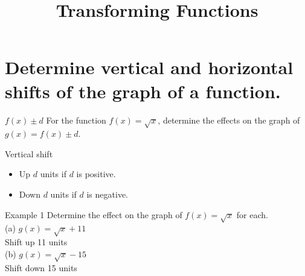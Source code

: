 \documentclass[t,usenames,dvipsnames]{beamer}
\title{Transforming Functions}
\author{}
\date{}
\begin{document}
\begin{frame}
    \titlepage
\end{frame}

\section{Determine vertical and horizontal shifts of the graph of a function.}

\begin{frame}{$f(x) \pm d$}
For the function $f(x) = \sqrt{x}$, determine the effects on the graph of $g(x) = f(x) \pm d$.   \newline\\  \pause

Vertical shift  \newline\\  \pause
\begin{itemize}
    \item<+-> Up $d$ units if $d$ is positive.  \newline\\  
    \item<+-> Down $d$ units if $d$ is negative.    \newline\\ 
\end{itemize}

\end{frame}


\begin{frame}{Example 1}
Determine the effect on the graph of $f(x) = \sqrt{x}$ for each.    \newline\\  \pause
(a) \quad $g(x) = \sqrt{x} + 11$    \newline\\  \pause
Shift up 11 units \newline\\ \pause
(b) \quad $g(x) = \sqrt{x} - 15$    \newline\\ \pause
Shift down 15 units
\end{frame}
\end{document}
